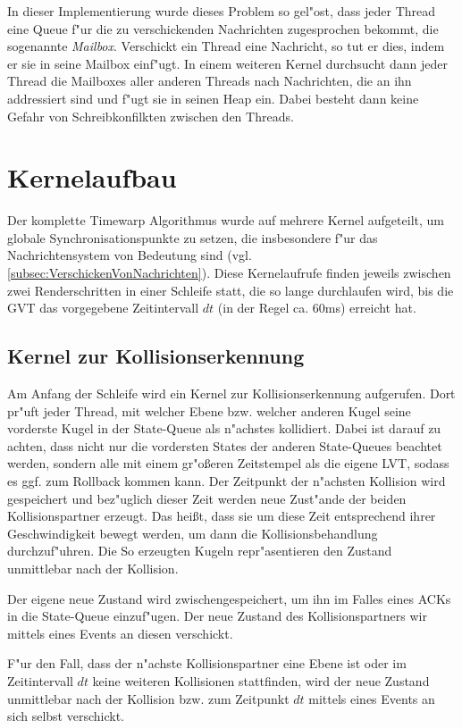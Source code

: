 \documentclass[a4paper, 10pt, openright, parskip, chapterprefix]{scrreprt}
\begin{document}
In dieser Implementierung wurde dieses Problem so gel"ost, dass jeder Thread eine Queue f"ur die zu verschickenden
Nachrichten zugesprochen bekommt, die sogenannte \emph{Mailbox}. Verschickt ein Thread eine Nachricht, so tut er dies,
indem er sie in seine Mailbox einf"ugt.
In einem weiteren
Kernel durchsucht dann jeder Thread die Mailboxes aller anderen Threads nach Nachrichten, die an ihn addressiert sind
und f"ugt sie in seinen Heap ein. Dabei besteht dann keine Gefahr von Schreibkonfilkten zwischen den Threads.


\section{Kernelaufbau}
\label{sec:Kernelaufbau}
Der komplette Timewarp Algorithmus wurde auf mehrere Kernel aufgeteilt, um globale Synchronisationspunkte zu setzen, die
insbesondere f"ur das Nachrichtensystem von Bedeutung sind (vgl. \ref{subsec:VerschickenVonNachrichten}).
Diese Kernelaufrufe finden jeweils zwischen zwei Renderschritten in einer Schleife statt, die so lange durchlaufen wird,
bis die GVT das vorgegebene Zeitintervall $dt$ (in der Regel ca. 60ms) erreicht hat.

\subsection{Kernel zur Kollisionserkennung}
Am Anfang der Schleife wird ein Kernel zur Kollisionserkennung aufgerufen. Dort pr"uft jeder Thread, mit welcher Ebene
bzw. welcher anderen Kugel seine vorderste Kugel in der State-Queue als n"achstes kollidiert. Dabei ist
darauf zu achten, dass nicht nur die vordersten States der anderen State-Queues beachtet werden, sondern alle mit einem
gr"o\ss eren Zeitstempel als die eigene LVT, sodass es ggf. zum Rollback kommen kann. Der Zeitpunkt der n"achsten
Kollision wird gespeichert und bez"uglich dieser Zeit werden neue Zust"ande der beiden Kollisionspartner erzeugt. Das
hei\ss t, dass sie um diese Zeit entsprechend ihrer Geschwindigkeit bewegt werden, um dann die Kollisionsbehandlung
durchzuf"uhren. Die So erzeugten Kugeln repr"asentieren den Zustand unmittlebar nach der Kollision.

Der eigene neue Zustand wird zwischengespeichert, um ihn im Falles eines ACKs in die State-Queue einzuf"ugen. Der neue
Zustand des Kollisionspartners wir mittels eines Events an diesen verschickt.

F"ur den Fall, dass der n"achste Kollisionspartner eine Ebene ist oder im Zeitintervall $dt$ keine weiteren Kollisionen
stattfinden, wird der neue Zustand unmittlebar nach der Kollision bzw. zum Zeitpunkt $dt$ mittels eines Events an sich
selbst verschickt.
\end{document}
